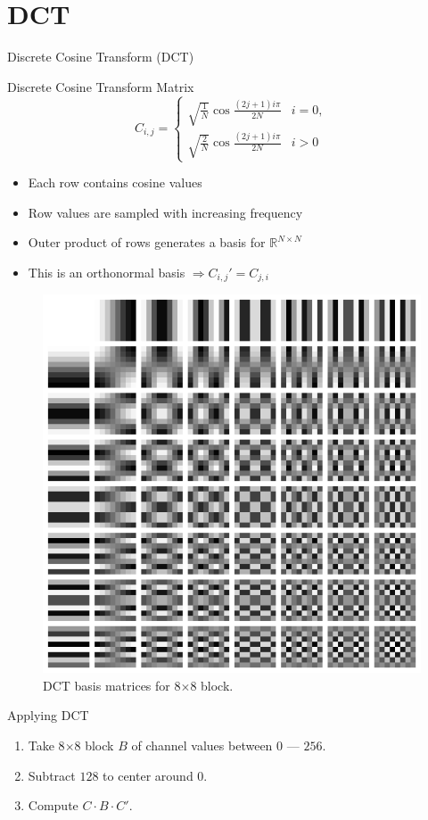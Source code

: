 \documentclass[10pt,aspectratio=169]{beamer}
\begin{document}
\section{DCT}

\begin{frame}{Discrete Cosine Transform (DCT)}
	\begin{block}{Discrete Cosine Transform Matrix}
		\vspace{0.5em}
		\begin{equation*}
			C_{i,j} =
				\begin{cases}
					\sqrt{\frac{1}{N}} \cos{\frac{(2j+1)i\pi}{2N}}  & i=0, \\
					\sqrt{\frac{2}{N}} \cos{\frac{(2j+1)i\pi}{2N}}  & i>0
				\end{cases}
		\end{equation*}
	\end{block}
	\begin{itemize}
		\item Each row contains cosine values
		\item Row values are sampled with increasing frequency
		\item Outer product of rows generates a basis for $ \mathbb{R}^{N \times N} $
		\item This is an orthonormal basis $\Rightarrow C_{i,j}' = C_{j,i}$ 
	\end{itemize}
\end{frame}

\begin{frame}[c,plain]
	\begin{figure}
		\centering
		\includegraphics[height=0.5\textwidth]{images/dct-basis.png}
		\caption{DCT basis matrices for 8$\times$8 block.}
	\end{figure}
\end{frame}

\begin{frame}{Applying DCT}
	\begin{enumerate}
		\item Take 8$\times$8 block $B$ of channel values between $0$ --- $256$.
		\item Subtract $128$ to center around $0$.
		\item Compute $ C \cdot B \cdot C' $.
	\end{enumerate}
\end{frame}
\end{document}
